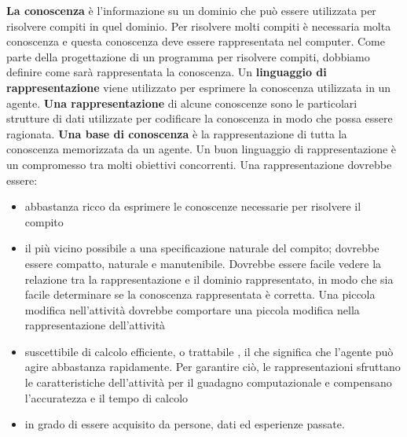 \documentclass[a4paper]{extarticle}
\begin{document}
\textbf{La conoscenza} è l'informazione su un dominio che può essere utilizzata per risolvere compiti in quel dominio. Per risolvere molti compiti è necessaria molta conoscenza e questa conoscenza deve essere rappresentata nel computer. Come parte della progettazione di un programma per risolvere compiti, dobbiamo definire come sarà rappresentata la conoscenza. Un \textbf{linguaggio di rappresentazione} viene utilizzato per esprimere la conoscenza utilizzata in un agente. \textbf{Una rappresentazione} di alcune conoscenze sono le particolari strutture di dati utilizzate per codificare la conoscenza in modo che possa essere ragionata. \textbf{Una base di conoscenza} è la rappresentazione di tutta la conoscenza memorizzata da un agente.
Un buon linguaggio di rappresentazione è un compromesso tra molti obiettivi concorrenti. Una rappresentazione dovrebbe essere:
\begin{itemize}
\item abbastanza ricco da esprimere le conoscenze necessarie per risolvere il compito
\item il più vicino possibile a una specificazione naturale del compito; dovrebbe essere compatto, naturale e manutenibile. Dovrebbe essere facile vedere la relazione tra la rappresentazione e il dominio rappresentato, in modo che sia facile determinare se la conoscenza rappresentata è corretta. Una piccola modifica nell'attività dovrebbe comportare una piccola modifica nella rappresentazione dell'attività
\item suscettibile di calcolo efficiente, o trattabile , il che significa che l'agente può agire abbastanza rapidamente. Per garantire ciò, le rappresentazioni sfruttano le caratteristiche dell'attività per il guadagno computazionale e compensano l'accuratezza e il tempo di calcolo
\item in grado di essere acquisito da persone, dati ed esperienze passate.
\end{itemize}
\end{document}
